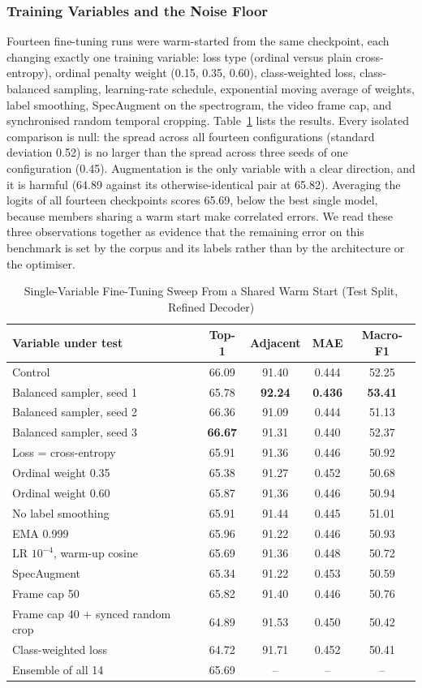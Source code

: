 \documentclass[journal]{IEEEtran}
\begin{document}
\subsubsection{Training Variables and the Noise Floor}
Fourteen fine-tuning runs were warm-started from the same checkpoint, each changing exactly one training variable: loss type (ordinal versus plain cross-entropy), ordinal penalty weight (0.15, 0.35, 0.60), class-weighted loss, class-balanced sampling, learning-rate schedule, exponential moving average of weights, label smoothing, SpecAugment on the spectrogram, the video frame cap, and synchronised random temporal cropping. Table~\ref{tab_sweep} lists the results. Every isolated comparison is null: the spread across all fourteen configurations (standard deviation 0.52) is no larger than the spread across three seeds of one configuration (0.45). Augmentation is the only variable with a clear direction, and it is harmful (64.89 against its otherwise-identical pair at 65.82). Averaging the logits of all fourteen checkpoints scores 65.69, below the best single model, because members sharing a warm start make correlated errors. We read these three observations together as evidence that the remaining error on this benchmark is set by the corpus and its labels rather than by the architecture or the optimiser.

\begin{table}[!t]
\renewcommand{\arraystretch}{1.2}
\caption{Single-Variable Fine-Tuning Sweep From a Shared Warm Start (Test Split, Refined Decoder)}
\label{tab_sweep}
\centering
\begin{tabular}{|l|c|c|c|c|}
\hline
Variable under test & Top-1 & Adjacent & MAE & Macro-F1\\
\hline
Control & 66.09 & 91.40 & 0.444 & 52.25\\
Balanced sampler, seed 1 & 65.78 & \textbf{92.24} & \textbf{0.436} & \textbf{53.41}\\
Balanced sampler, seed 2 & 66.36 & 91.09 & 0.444 & 51.13\\
Balanced sampler, seed 3 & \textbf{66.67} & 91.31 & 0.440 & 52.37\\
Loss = cross-entropy & 65.91 & 91.36 & 0.446 & 50.92\\
Ordinal weight 0.35 & 65.38 & 91.27 & 0.452 & 50.68\\
Ordinal weight 0.60 & 65.87 & 91.36 & 0.446 & 50.94\\
No label smoothing & 65.91 & 91.44 & 0.445 & 51.01\\
EMA 0.999 & 65.96 & 91.22 & 0.446 & 50.93\\
LR $10^{-4}$, warm-up cosine & 65.69 & 91.36 & 0.448 & 50.72\\
SpecAugment & 65.34 & 91.22 & 0.453 & 50.59\\
Frame cap 50 & 65.82 & 91.40 & 0.446 & 50.76\\
Frame cap 40 + synced random crop & 64.89 & 91.53 & 0.450 & 50.42\\
Class-weighted loss & 64.72 & 91.71 & 0.452 & 50.41\\
\hline
Ensemble of all 14 & 65.69 & -- & -- & --\\
\hline
\end{tabular}
\end{table}
\end{document}
